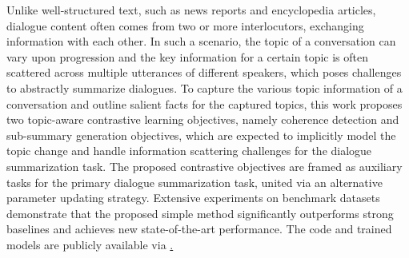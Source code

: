 Unlike well-structured text, such as news reports and encyclopedia articles, dialogue content often comes from two or more interlocutors, exchanging information with each other. In such a scenario,  the topic of a conversation can vary upon progression and the key information for a certain topic is often scattered across multiple utterances of different speakers, which poses challenges to abstractly summarize dialogues. To capture the various topic information of a conversation and outline salient facts for the captured topics, this work proposes two topic-aware contrastive learning objectives, namely coherence detection and sub-summary generation objectives, which are expected to implicitly model the topic change and handle information scattering challenges for the dialogue summarization task. The proposed contrastive objectives are framed as auxiliary tasks for the primary dialogue summarization task, united via an alternative parameter updating strategy. Extensive experiments on benchmark datasets demonstrate that the proposed simple method significantly outperforms strong baselines and achieves new state-of-the-art performance. The code and trained models are publicly available via \href{https://github.com/Junpliu/ConDigSum}.
